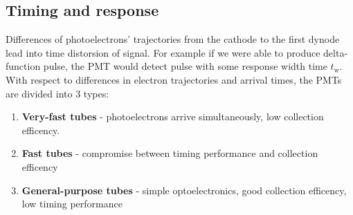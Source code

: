 
\subsection{Timing and response}
Differences of photoelectrons' trajectories from the cathode to the first dynode lead into time distorsion of signal. For example if we were able to produce delta-function pulse, the PMT would detect pulse with some response width time $t_\textrm{w}$.
With respect to differences in electron trajectories and arrival times, the PMTs are divided into 3 types:
\begin{enumerate}
\item \textbf{Very-fast tubes} - photoelectrons arrive simultaneously, low collection efficency.
\item \textbf{Fast tubes} - compromise between timing performance and collection efficency
\item \textbf{General-purpose tubes} - simple optoelectronics, good collection efficency, low timing performance
\end{enumerate}

